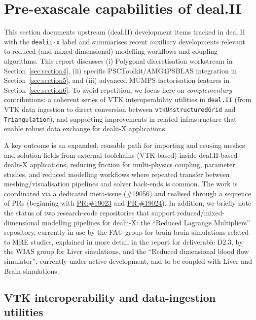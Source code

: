\documentclass[a4paper,12pt]{article}
\newcommand{\issue}[1]{\href{https://github.com/dealii/dealii/issues/#1}{\##1}}
\newcommand{\pr}[1]{\href{https://github.com/dealii/dealii/pull/#1}{PR:\##1}}
\begin{document}
\section{{Pre-exascale capabilities of deal.II}}
\label{sec:section2}

This section documents upstream (deal.II) development items tracked
in deal.II with the \texttt{dealii-x} label and summarises recent auxiliary
developments relevant to reduced (and mixed-dimensional) modelling
workflows and coupling algorithms. This report discusses (i) Polygonal discretisation
workstream in Section~\ref{sec:section4}, (ii) specific
PSCToolkit/AMG4PSBLAS integration in Section~\ref{sec:section5}, and
(iii) advanced MUMPS factorisation features in
Section~\ref{sec:section6}. To avoid repetition, we focus here on
\emph{complementary} contributions: a coherent series of VTK
interoperability utilities in \texttt{deal.II} (from VTK data
ingestion to direct conversion between \texttt{vtkUnstructuredGrid}
and \texttt{Triangulation}), and supporting improvements in related
infrastructure that enable robust data exchange for dealii-X
applications. 

A key outcome is an expanded, reusable path for importing and reusing
meshes and solution fields from external toolchains (VTK-based) inside
deal.II-based dealii-X applications, reducing friction for
multi-physics coupling, parameter studies, and reduced modelling
workflows where repeated transfer between meshing/visualisation
pipelines and solver back-ends is common. The work is coordinated via
a dedicated meta-issue (\issue{19056}) and realised through a sequence
of PRs (beginning with \pr{19023} and \pr{19024}). In addition, we
briefly note the status of two research-code repositories that support
reduced/mixed-dimensional modelling pipelines for dealii-X: the
``Reduced Lagrange Multipliers'' repository, currently in use by the
FAU group for brain brain simulations related to MRE studies, explained in more detail in the report for deliverable D2.3, by
the WIAS group for Liver simulations, and the ``Reduced dimensional
blood flow simulator'', currently under active development, and to be
coupled with Liver and Brain simulations. 

\subsection{VTK interoperability and data-ingestion
  utilities} \label{sec:dealii_x_vtk} 
\end{document}
